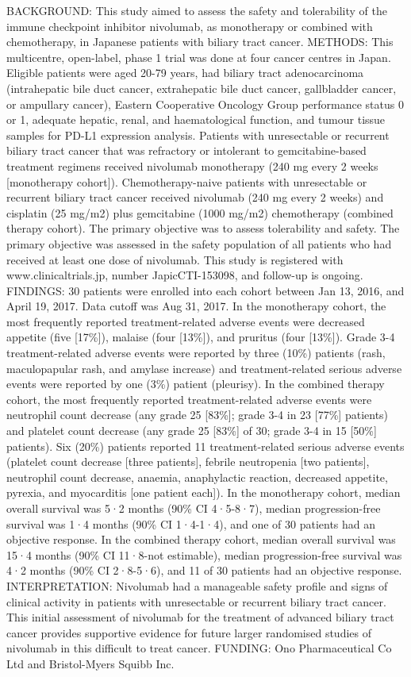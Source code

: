 \documentclass[]{article}
\begin{document}
BACKGROUND: This study aimed to assess the safety and tolerability of
the immune checkpoint inhibitor nivolumab, as monotherapy or combined
with chemotherapy, in Japanese patients with biliary tract cancer.
METHODS: This multicentre, open-label, phase 1 trial was done at four
cancer centres in Japan. Eligible patients were aged 20-79 years, had
biliary tract adenocarcinoma (intrahepatic bile duct cancer,
extrahepatic bile duct cancer, gallbladder cancer, or ampullary cancer),
Eastern Cooperative Oncology Group performance status 0 or 1, adequate
hepatic, renal, and haematological function, and tumour tissue samples
for PD-L1 expression analysis. Patients with unresectable or recurrent
biliary tract cancer that was refractory or intolerant to
gemcitabine-based treatment regimens received nivolumab monotherapy (240
mg every 2 weeks {[}monotherapy cohort{]}). Chemotherapy-naive patients
with unresectable or recurrent biliary tract cancer received nivolumab
(240 mg every 2 weeks) and cisplatin (25 mg/m2) plus gemcitabine (1000
mg/m2) chemotherapy (combined therapy cohort). The primary objective was
to assess tolerability and safety. The primary objective was assessed in
the safety population of all patients who had received at least one dose
of nivolumab. This study is registered with www.clinicaltrials.jp,
number JapicCTI-153098, and follow-up is ongoing. FINDINGS: 30 patients
were enrolled into each cohort between Jan 13, 2016, and April 19, 2017.
Data cutoff was Aug 31, 2017. In the monotherapy cohort, the most
frequently reported treatment-related adverse events were decreased
appetite (five {[}17\%{]}), malaise (four {[}13\%{]}), and pruritus
(four {[}13\%{]}). Grade 3-4 treatment-related adverse events were
reported by three (10\%) patients (rash, maculopapular rash, and amylase
increase) and treatment-related serious adverse events were reported by
one (3\%) patient (pleurisy). In the combined therapy cohort, the most
frequently reported treatment-related adverse events were neutrophil
count decrease (any grade 25 {[}83\%{]}; grade 3-4 in 23 {[}77\%{]}
patients) and platelet count decrease (any grade 25 {[}83\%{]} of 30;
grade 3-4 in 15 {[}50\%{]} patients). Six (20\%) patients reported 11
treatment-related serious adverse events (platelet count decrease
{[}three patients{]}, febrile neutropenia {[}two patients{]}, neutrophil
count decrease, anaemia, anaphylactic reaction, decreased appetite,
pyrexia, and myocarditis {[}one patient each{]}). In the monotherapy
cohort, median overall survival was 5·2 months (90\% CI 4·5-8·7), median
progression-free survival was 1·4 months (90\% CI 1·4-1·4), and one of
30 patients had an objective response. In the combined therapy cohort,
median overall survival was 15·4 months (90\% CI 11·8-not estimable),
median progression-free survival was 4·2 months (90\% CI 2·8-5·6), and
11 of 30 patients had an objective response. INTERPRETATION: Nivolumab
had a manageable safety profile and signs of clinical activity in
patients with unresectable or recurrent biliary tract cancer. This
initial assessment of nivolumab for the treatment of advanced biliary
tract cancer provides supportive evidence for future larger randomised
studies of nivolumab in this difficult to treat cancer. FUNDING: Ono
Pharmaceutical Co Ltd and Bristol-Myers Squibb Inc.
\end{document}
